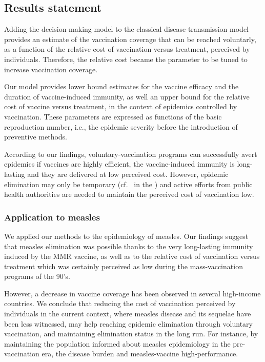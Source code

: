 \subsection{Results statement}
\label{Vaccine:Results}

Adding the decision-making model to the classical disease-transmission model provides an estimate of the vaccination coverage that can be reached voluntarly, as a function of the relative cost of vaccination versus treatment, perceived by individuals. Therefore, the relative cost became the parameter to be tuned to increase vaccination coverage.

Our model provides lower bound estimates for the vaccine efficacy and the duration of vaccine-induced immunity, as well an upper bound for the relative cost of vaccine versus treatment, in the context of epidemics controlled by vaccination. These parameters are expressed as functions of the basic reproduction number, i.e., the epidemic severity before the introduction of preventive methods. 

According to our findings, voluntary-vaccination programs can successfully avert epidemics if vaccines are highly efficient, the vaccine-induced immunity is long-lasting and they are delivered at low perceived cost. However, epidemic elimination may only be temporary (cf.~ in the ) and active efforts from public health authorities are needed to maintain the perceived cost of vaccination low. 



\subsubsection{Application to measles}
We applied our methods to the epidemiology of measles. Our findings suggest that measles elimination was possible thanks to the very long-lasting immunity induced by the MMR vaccine, as well as to the relative cost of vaccination versus treatment which was certainly perceived as low during the mass-vaccination programs of the 90's. 

However, a decrease in vaccine coverage has been observed in several high-income countries. We conclude that reducing the cost of vaccination perceived by individuals in the current context, where measles disease and its sequelae have been less witnessed, may help reaching epidemic elimination through voluntary vaccination, and maintaining elimination status in the long run. For instance, by maintaining the population informed about measles epidemiology in the pre-vaccination era, the disease burden and measles-vaccine high-performance.


